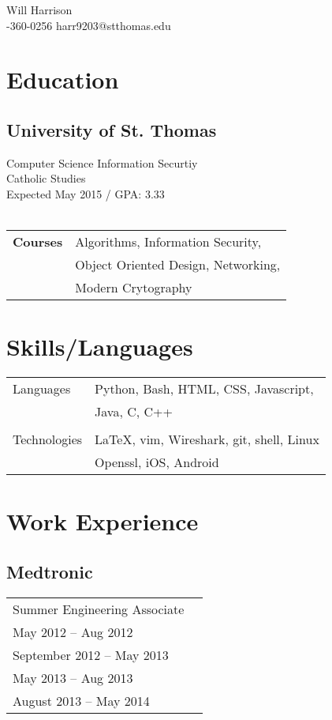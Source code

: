 \documentclass{article}[11pt]
\begin{document}


\begin{multicols}{2}
		{\fontsize{40}{40}\selectfont Will Harrison} \\
		\vfill
	\columnbreak
		-360-0256 \Letter harr9203@stthomas.edu \\
		\vfill
	\columnbreak
\end{multicols}
\begin{multicols}{2}
	\section*{Education}
	\subsection*{University of St. Thomas}
	Computer Science Information Securtiy\\
	Catholic Studies \\
	Expected May 2015 / GPA: 3.33 \\\\
	\begin{tabular}{l l}
	\textbf{Courses}	& Algorithms, Information Security, \\
				& Object Oriented Design, Networking, \\
				& Modern Crytography \\
	\end{tabular}
		\vfill
		\columnbreak
	\section*{Skills/Languages}
	\begin{tabular}{l l}
	Languages	& Python, Bash, HTML, CSS, Javascript, \\ 
			& Java, C, C++ \\\\
	Technologies	& \LaTeX, vim, Wireshark, git, shell, Linux \\
			& Openssl, iOS, Android \\
	\end{tabular}
		\vfill
		\columnbreak
\end{multicols}
	\section*{Work Experience}
	\subsection*{Medtronic}
	\begin{tabular}{l l}
	Summer Engineering Associate 	& \\
	May 2012 -- Aug 2012 		& \\
	September 2012 -- May 2013 	& \\
	May 2013 -- Aug 2013 		& \\
	August 2013 -- May 2014 	& \\
	\end{tabular}
	\hfill
\end{document}
